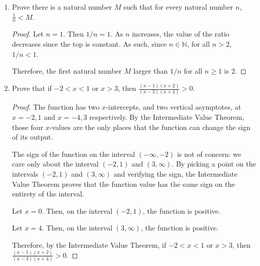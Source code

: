 \documentclass[10pt]{article}
\theoremstyle{definition}
\theoremstyle{plain}
\newcommand{\N}{\mathbb{N}}
\begin{document}
\begin{enumerate}
\item Prove there is a natural number $M$ such that for every natural number $n$, $\frac{1}{n} < M$.
  \begin{proof}
    Let $n=1$. Then $1/n=1$. As $n$ increases, the value of the ratio decreases since the top is constant. As such, since $n\in\N$, for all $n>2$, $1/n < 1$.
    \\
    \par Therefore, the first natural number $M$ larger than $1/n$ for all $n\geq 1$ is $2$.
  \end{proof}

\item Prove that if $-2 < x < 1$ or $x > 3$, then $\frac{(x-1)(x+2)}{(x-3)(x+4)} > 0$.
  \begin{proof}
    The function has two $x$-intercepts, and two vertical asymptotes, at $x=-2,1$ and $x=-4,3$ respectively. By the Intermediate Value Theorem, those four $x$-values are the only places that the function can change the sign of its output.
    \\
    \par The sign of the function on the interval $(-\infty, -2)$ is not of concern: we care only about the interval $(-2,1)$ and $(3,\infty)$. By picking a point on the intervals $(-2,1)$ and $(3,\infty)$ and verifying the sign, the Intermediate Value Theorem proves that the function value has the same sign on the entirety of the interval.
    \\
    \par Let $x=0$. Then, on the interval $(-2,1)$, the function is positive.
    \\
    \par Let $x=4$. Then, on the interval $(3,\infty)$, the function is positive.
    \\
    \par Therefore, by the Intermediate Value Theorem, if $-2 < x < 1$ or $x > 3$, then $\frac{(x-1)(x+2)}{(x-3)(x+4)} > 0$.
  \end{proof}
\end{enumerate}
\end{document}
